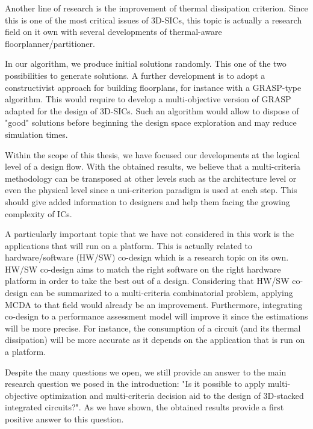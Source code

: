 Another line of research is the improvement of thermal dissipation criterion. Since this is one of the most critical issues of 3D-SICs, this topic is actually a research field on it own with several developments of thermal-aware floorplanner/partitioner.

In our algorithm, we produce initial solutions randomly. This one of the two possibilities to generate solutions. A further development is to adopt a constructivist approach for building floorplans, for instance with a GRASP-type algorithm. This would require to develop a multi-objective version of GRASP adapted for the design of 3D-SICs. Such an algorithm would allow to dispose of "good" solutions before beginning the design space exploration and may reduce simulation times.

Within the scope of this thesis, we have focused our developments at the logical level of a design flow. With the obtained results, we believe that a multi-criteria methodology can be transposed at other levels such as the architecture level or even the physical level since a uni-criterion paradigm is used at each step. This should give added information to designers and help them facing the growing complexity of ICs.

A particularly important topic that we have not considered in this work is the applications that will run on a platform. This is actually related to hardware/software (HW/SW) co-design which is a research topic on its own. HW/SW co-design aims to match the right software on the right hardware platform in order to take the best out of a design. Considering that HW/SW co-design can be summarized to a multi-criteria combinatorial problem, applying MCDA to that field would already be an improvement. Furthermore, integrating co-design to a performance assessment model will improve it since the estimations will be more precise. For instance, the consumption of a circuit (and its thermal dissipation) will be more accurate as it depends on the application that is run on a platform.


Despite the many questions we open, we still provide an answer to the main research question we posed in the introduction: "Is it possible to apply multi-objective optimization and multi-criteria decision aid to the design of 3D-stacked integrated circuits?". As we have shown, the obtained results provide a first positive answer to this question.